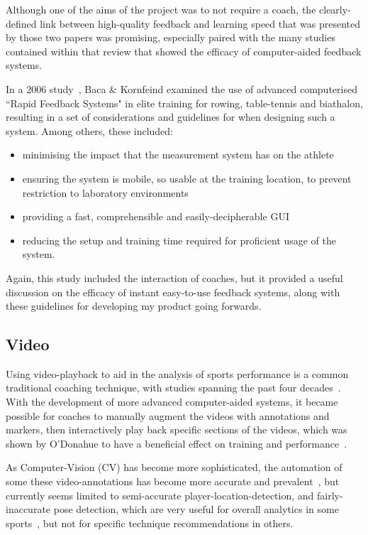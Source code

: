 Although one of the aims of the project was to not require a coach, the clearly-defined link between high-quality feedback and learning speed that was presented by those two papers was promising, especially paired with the many studies contained within that review that showed the efficacy of computer-aided feedback systems.

In a 2006 study~\cite{bacafeedback}, Baca \& Kornfeind examined the use of advanced computerised ``Rapid Feedback Systems" in elite training for rowing, table-tennis and biathalon, resulting in a set of considerations and guidelines for when designing such a system.
Among others, these included:
\begin{itemize}
    \item minimising the impact that the measurement system has on the athlete
    \item ensuring the system is mobile, so usable at the training location, to prevent restriction to laboratory environments
    \item providing a fast, comprehensible and easily-decipherable GUI
    \item reducing the setup and training time required for proficient usage of the system.
\end{itemize}

Again, this study included the interaction of coaches, but it provided a useful discussion on the efficacy of instant easy-to-use feedback systems, along with these guidelines for developing my product going forwards.

\subsection{Video}
Using video-playback to aid in the analysis of sports performance is a common traditional coaching technique, with studies spanning the past four decades~\cite{sportperformance86, groomcoachperceptions, groomvideo}.
With the development of more advanced computer-aided systems, it became possible for coaches to manually augment the videos with annotations and markers\cite{kinovea}, then interactively play back specific sections of the videos, which was shown by O'Donahue to have a beneficial effect on training and performance~\cite{odonovideo}.

As Computer-Vision (CV) has become more sophisticated, the automation of some these video-annotations has become more accurate and prevalent~\cite{cvinsport}, but currently seems limited to semi-accurate player-location-detection, and fairly-inaccurate pose detection, which are very useful for overall analytics in some sports~\cite{pansiottenniscv}, but not for specific technique recommendations in others.

